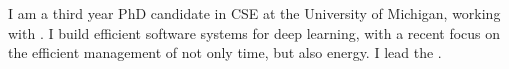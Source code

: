 

\begin{cvparagraph}

I am a third year PhD candidate in CSE at the University of Michigan, working with \href{https://mosharaf.com}{}.
I build efficient software systems for deep learning, with a recent focus on the efficient management of not only time, but also energy.
I lead the \href{https://ml.energy}{}.
\end{cvparagraph}
